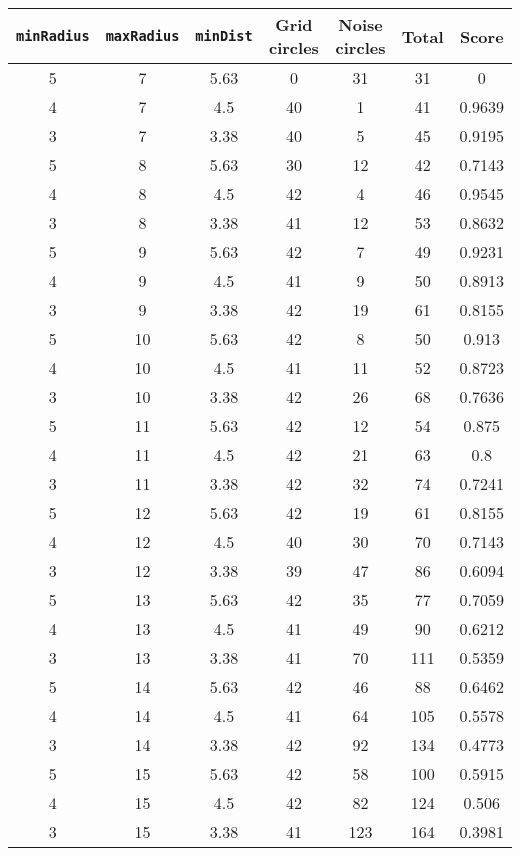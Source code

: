 \documentclass[letterpaper, 12pt]{article}
\begin{document}
\begin{longtable}{|c|c|c|c|c|c|c|}
\hline
\textbf{\texttt{minRadius}} & \textbf{\texttt{maxRadius}} & \textbf{\texttt{minDist}} & \textbf{Grid circles} & \textbf{Noise circles} & \textbf{Total} & \textbf{Score} \\
\hline
5 & 7 & 5.63 & 0 & 31 & 31 & 0 \\
\hline
4 & 7 & 4.5 & 40 & 1 & 41 & 0.9639 \\
\hline
3 & 7 & 3.38 & 40 & 5 & 45 & 0.9195 \\
\hline
5 & 8 & 5.63 & 30 & 12 & 42 & 0.7143 \\
\hline
4 & 8 & 4.5 & 42 & 4 & 46 & 0.9545 \\
\hline
3 & 8 & 3.38 & 41 & 12 & 53 & 0.8632 \\
\hline
5 & 9 & 5.63 & 42 & 7 & 49 & 0.9231 \\
\hline
4 & 9 & 4.5 & 41 & 9 & 50 & 0.8913 \\
\hline
3 & 9 & 3.38 & 42 & 19 & 61 & 0.8155 \\
\hline
5 & 10 & 5.63 & 42 & 8 & 50 & 0.913 \\
\hline
4 & 10 & 4.5 & 41 & 11 & 52 & 0.8723 \\
\hline
3 & 10 & 3.38 & 42 & 26 & 68 & 0.7636 \\
\hline
5 & 11 & 5.63 & 42 & 12 & 54 & 0.875 \\
\hline
4 & 11 & 4.5 & 42 & 21 & 63 & 0.8 \\
\hline
3 & 11 & 3.38 & 42 & 32 & 74 & 0.7241 \\
\hline
5 & 12 & 5.63 & 42 & 19 & 61 & 0.8155 \\
\hline
4 & 12 & 4.5 & 40 & 30 & 70 & 0.7143 \\
\hline
3 & 12 & 3.38 & 39 & 47 & 86 & 0.6094 \\
\hline
5 & 13 & 5.63 & 42 & 35 & 77 & 0.7059 \\
\hline
4 & 13 & 4.5 & 41 & 49 & 90 & 0.6212 \\
\hline
3 & 13 & 3.38 & 41 & 70 & 111 & 0.5359 \\
\hline
5 & 14 & 5.63 & 42 & 46 & 88 & 0.6462 \\
\hline
4 & 14 & 4.5 & 41 & 64 & 105 & 0.5578 \\
\hline
3 & 14 & 3.38 & 42 & 92 & 134 & 0.4773 \\
\hline
5 & 15 & 5.63 & 42 & 58 & 100 & 0.5915 \\
\hline
4 & 15 & 4.5 & 42 & 82 & 124 & 0.506 \\
\hline
3 & 15 & 3.38 & 41 & 123 & 164 & 0.3981 \\

\end{longtable}
\end{document}
